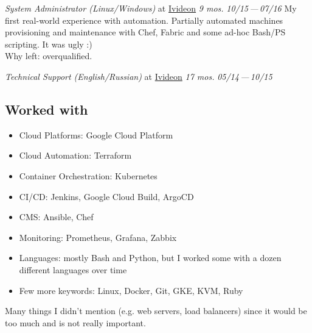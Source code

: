 \documentclass[11pt, a4paper]{article}
\newcommand{\Delimitline}{
  \vspace{-2ex}
  \noindent\makebox[\linewidth]{\rule{\DelimitlineLength}{0.12ex}} }
\newcommand{\forceindent}{\leavevmode{\parindent=1em\indent}}
\begin{document}
\begin{etaremune}[
  topsep=1ex,itemsep=1.5ex,partopsep=0ex,
  parsep=0ex,rightmargin=1em,leftmargin=2em
]
  \item
    \emph{System Administrator (Linux/Windows)}\hfill
    at \href{https://ivideon.com}{Ivideon}\hspace{1.0em}
    \textit{9 mos.}\hspace{1.0em}
    \textit{10/15\,—\,07/16}\vspace{1.5ex}\newline
    \forceindent My first real-world experience with automation. Partially automated machines provisioning and maintenance with Chef, Fabric and some ad-hoc Bash/PS scripting. It was ugly :)\\[0.7ex]
    \forceindent Why left: overqualified.

  \item
    \emph{Technical Support (English/Russian)}\hfill
    at \href{https://ivideon.com}{Ivideon}\hspace{1.0em}
    \textit{17 mos.}\hspace{1.0em}
    \textit{05/14\,—\,10/15}
\end{etaremune}

\vspace{0ex}


\subsection*{Worked with\vphantom{ (skills)}}
\Delimitline

\begin{itemize}
  \item Cloud Platforms: Google Cloud Platform
  \item Cloud Automation: Terraform
  \item Container Orchestration: Kubernetes
  \item CI/CD: Jenkins, Google Cloud Build, ArgoCD
  \item CMS: Ansible, Chef
  \item Monitoring: Prometheus, Grafana, Zabbix
  \item Languages: mostly Bash and Python, but I worked some with a dozen different languages over time
  \item Few more keywords: Linux, Docker, Git, GKE, KVM, Ruby
\end{itemize}

\forceindent Many things I didn't mention (e.g. web servers, load balancers) since it would be too much and is not really important.


\subsection*{\vphantom{Education: }}
\vphantom{ middle school}
\end{document}
